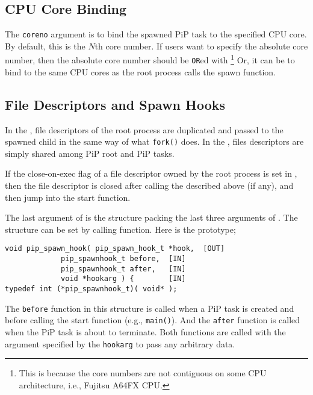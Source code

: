 \subsection{CPU Core Binding}

The {\tt coreno} argument is to bind the spawned PiP task to the
specified CPU core. By default, this is the $N$th core number. If
users want to specify the absolute core number, then the absolute core
number should be {\tt OR}ed with
\footnote{This is because the core numbers
are not contiguous on some CPU architecture, i.e., Fujitsu A64FX CPU.}
Or, it can be  to bind to the same CPU cores
as the root process calls the spawn function.

\subsection{File Descriptors and Spawn Hooks}

In the , file descriptors of the root process
are duplicated and passed to the spawned child in the same way of what
{\tt fork()} does. In the , files descriptors
are simply shared among PiP root and PiP tasks. 

If the close-on-exec flag of a file descriptor owned by the root
process is set in , then the file descriptor is
closed after calling the  described above (if
any), and then jump into the start function.  

The last argument of  is the structure
packing the last three arguments of . The
 structure can be set by calling
 function. Here is the prototype;

\begin{lstlisting}[frame=tb]
void pip_spawn_hook( pip_spawn_hook_t *hook,  [OUT]
		     pip_spawnhook_t before,  [IN]
		     pip_spawnhook_t after,   [IN]
		     void *hookarg ) {        [IN]
typedef int (*pip_spawnhook_t)( void* );
\end{lstlisting}

The {\tt before} function in this structure is called when a
PiP task is created and before calling the start function (e.g.,
{\tt main()}). And the {\tt after} function is called when the PiP
task is about to terminate. Both functions are called with the argument
specified by the {\tt hookarg} to pass any arbitrary data. 

